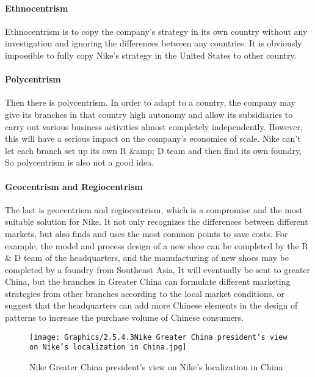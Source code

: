 \documentclass[a4paper, 12pt]{report}
\begin{document}
\paragraph{Ethnocentrism}
Ethnocentrism is to copy the company's strategy in its own country without any investigation and ignoring the differences between any countries. It is obviously impossible to fully copy Nike's strategy in the United States to other country.
\paragraph{Polycentrism}
Then there is polycentrism. In order to adapt to a country, the company may give its branches in that country high autonomy and allow its subsidiaries to carry out various business activities almost completely independently. However, this will have a serious impact on the company's economies of scale. Nike can't let each branch set up its own R &amp; D team and then find its own foundry, So polycentrism is also not a good idea.
\paragraph{Geocentrism and Regiocentrism}
The last is geocentrism and regiocentrism, which is a compromise and the most suitable solution for Nike. It not only recognizes the differences between different markets, but also finds and uses the most common points to save costs. For example, the model and process design of a new shoe can be completed by the R & D team of the headquarters, and the manufacturing of new shoes may be completed by a foundry from Southeast Asia, It will eventually be sent to greater China, but the branches in Greater China can formulate different marketing strategies from other branches according to the local market conditions, or suggest that the headquarters can add more Chinese elements in the design of patterns to increase the purchase volume of Chinese consumers.
\begin{figure}[ht]
 			\begin{center}
				\texttt{[image: Graphics/2.5.4.3Nike Greater China president's view on Nike's localization in China.jpg]}
			\end{center}
       		\caption{\label{2.5.4.3}Nike Greater China president's view on Nike's localization in China}
 \end{figure}
\end{document}
